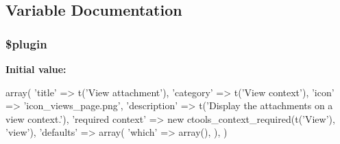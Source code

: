 \subsection{Variable Documentation}
\hypertarget{views__attachments_8inc_ada8a7130088351710bb02ed622d6bf65}{
\subsubsection[{\$plugin}]{\setlength{\rightskip}{0pt plus 5cm}\$plugin}}
\label{views__attachments_8inc_ada8a7130088351710bb02ed622d6bf65}
{\bfseries Initial value:}
\begin{DoxyCode}
 array(
  'title' => t('View attachment'),
  'category' => t('View context'),
  'icon' => 'icon_views_page.png',
  'description' => t('Display the attachments on a view context.'),
  'required context' => new ctools_context_required(t('View'), 'view'),
  'defaults' => array(
    'which' => array(),
  ),
)
\end{DoxyCode}
